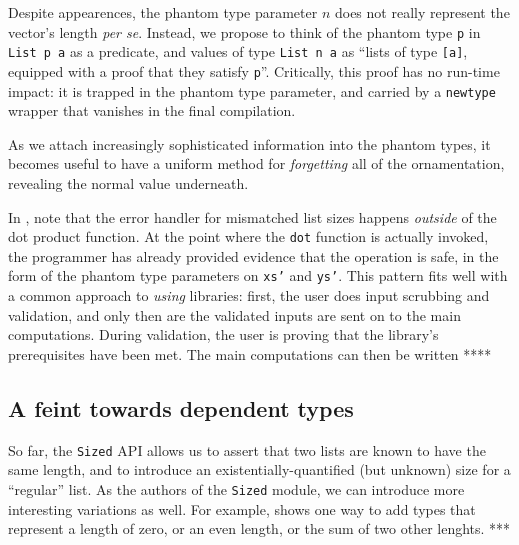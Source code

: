 \documentclass[format=sigplan, review=false, screen=true]{acmart}
\begin{document}
Despite  appearences, the phantom type parameter $n$ does not really represent the vector's length
{\em per se}. Instead, we propose to think of the phantom type \texttt{p} in \texttt{List p a} as a predicate,
and values of type \texttt{List n a} as ``lists of type \texttt{[a]}, equipped with a proof
that they satisfy \texttt{p}''. Critically, this proof has no run-time impact: it is trapped in the
phantom type parameter, and carried by a \texttt{newtype} wrapper that vanishes in
the final compilation.


As we attach increasingly sophisticated information into the phantom types, it becomes useful to
have a uniform method for \emph{forgetting} all of the ornamentation, revealing the normal
value underneath.

In , note that the error handler for mismatched list sizes happens
\emph{outside} of the dot product function. At the point where the \texttt{dot} function
is actually invoked, the programmer has already provided evidence that the operation is
safe, in the form of the phantom type parameters on \texttt{xs'} and \texttt{ys'}. This pattern
fits well with a common approach to \emph{using} libraries: first, the user does input scrubbing
and validation, and only then are the validated inputs are sent on to the main computations. 
During validation, the user is proving that the library's prerequisites have been met. The
main computations can then be written **** 

\subsection{A feint towards dependent types}
So far, the \texttt{Sized} API allows us to assert that two lists are known to have the same
length, and to introduce an existentially-quantified (but unknown) size for a ``regular'' list.
As the authors of the \texttt{Sized} module, we can introduce more interesting variations as
well. For example,  shows one way to add types that represent a length of
zero, or an even length, or the sum of two other lenghts. ***
\end{document}

